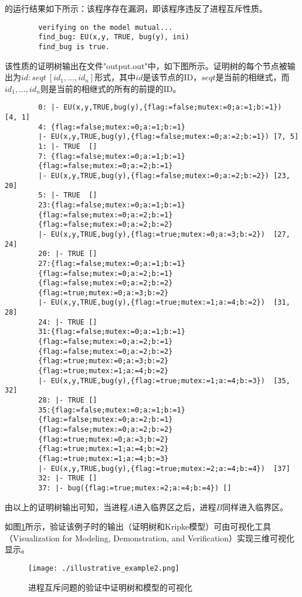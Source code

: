 \begin{example}[进程互斥问题\cite{Peterson81}]
	\sctlprov{}的运行结果如下所示：该程序存在漏洞，即该程序违反了进程互斥性质。
	\begin{center}
		\small
		\begin{verbatim}
		verifying on the model mutual...
		find_bug: EU(x,y, TRUE, bug(y), ini)
		find_bug is true.
		\end{verbatim}
	\end{center}
	该性质的证明树输出在文件"output.out"中，如下图所示。证明树的每个节点被输出为${id: seqt ~ [id_1, ..., id_n]}$形式，其中$id$是该节点的ID，$seqt$是当前的相继式，而${id_1,...,id_n}$则是当前的相继式的所有的前提的ID。
	\begin{center}
		\small
		\begin{verbatim}
		0: |- EU(x,y,TRUE,bug(y),{flag:=false;mutex:=0;a:=1;b:=1})	[4, 1]
		4: {flag:=false;mutex:=0;a:=1;b:=1}
		|- EU(x,y,TRUE,bug(y),{flag:=false;mutex:=0;a:=2;b:=1})	[7, 5]
		1: |- TRUE	[]
		7: {flag:=false;mutex:=0;a:=1;b:=1} 
		{flag:=false;mutex:=0;a:=2;b:=1}
		|- EU(x,y,TRUE,bug(y),{flag:=false;mutex:=0;a:=2;b:=2})	[23, 20]
		5: |- TRUE	[]
		23:{flag:=false;mutex:=0;a:=1;b:=1} 
		{flag:=false;mutex:=0;a:=2;b:=1} 
		{flag:=false;mutex:=0;a:=2;b:=2}
		|- EU(x,y,TRUE,bug(y),{flag:=true;mutex:=0;a:=3;b:=2})	[27, 24]
		20: |- TRUE	[]
		27:{flag:=false;mutex:=0;a:=1;b:=1} 
		{flag:=false;mutex:=0;a:=2;b:=1} 
		{flag:=false;mutex:=0;a:=2;b:=2} 
		{flag:=true;mutex:=0;a:=3;b:=2}
		|- EU(x,y,TRUE,bug(y),{flag:=true;mutex:=1;a:=4;b:=2})	[31, 28]
		24: |- TRUE	[]
		31:{flag:=false;mutex:=0;a:=1;b:=1} 
		{flag:=false;mutex:=0;a:=2;b:=1} 
		{flag:=false;mutex:=0;a:=2;b:=2} 
		{flag:=true;mutex:=0;a:=3;b:=2} 
		{flag:=true;mutex:=1;a:=4;b:=2}
		|- EU(x,y,TRUE,bug(y),{flag:=true;mutex:=1;a:=4;b:=3})	[35, 32]
		28: |- TRUE	[]
		35:{flag:=false;mutex:=0;a:=1;b:=1} 
		{flag:=false;mutex:=0;a:=2;b:=1} 
		{flag:=false;mutex:=0;a:=2;b:=2} 
		{flag:=true;mutex:=0;a:=3;b:=2} 
		{flag:=true;mutex:=1;a:=4;b:=2} 
		{flag:=true;mutex:=1;a:=4;b:=3}
		|- EU(x,y,TRUE,bug(y),{flag:=true;mutex:=2;a:=4;b:=4})	[37]
		32: |- TRUE	[]
		37: |- bug({flag:=true;mutex:=2;a:=4;b:=4})	[]
		\end{verbatim}
	\end{center}
	由以上的证明树输出可知，当进程$A$进入临界区之后，进程$B$同样进入临界区。
	
	如图\ref{fig:visualize:illustrative}所示，\sctlprov{}验证该例子时的输出（证明树和Kripke模型）可由可视化工具（Visualization for Modeling, Demonstration, and Verification）实现三维可视化显示。
	\begin{figure}[!h]
		\centering
		\texttt{[image: ./illustrative\_example2.png]}
		\caption{进程互斥问题的验证中证明树和模型的可视化}
		\label{fig:visualize:illustrative}
	\end{figure}
	

\end{example}
